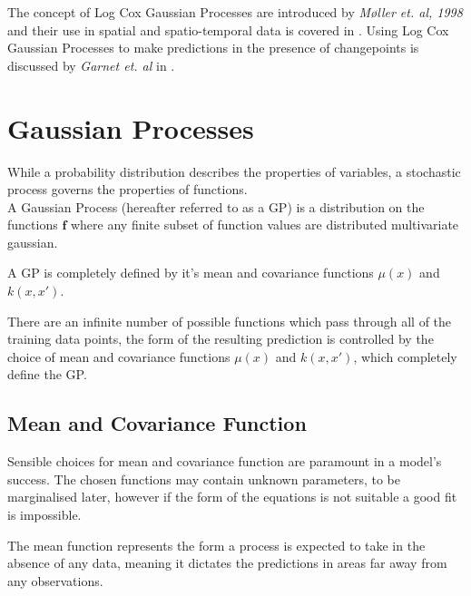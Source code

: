 \documentclass[a4paper,11pt]{report}
\begin{document}
The concept of Log Cox Gaussian Processes are introduced by \textit{M\o ller et. al, 1998} \cite{LGCP-moller} and their use in spatial and spatio-temporal data is covered in \cite{LGCP-diggle}. Using Log Cox Gaussian Processes to make predictions in the presence of changepoints is discussed by \textit{Garnet et. al} in \cite{changepoint-prediction}.

\chapter{Gaussian Processes}

While a probability distribution describes the properties of variables, a stochastic process governs the properties of functions. \\

A Gaussian Process (hereafter referred to as a GP) is a distribution on the functions \(\mathbf{f}\) where any finite subset of function values are distributed multivariate gaussian. 

A GP is completely defined by it's mean and covariance functions \(\mu (x)\) and \( k(x,x')\). 

There are an infinite number of possible functions which pass through all of the training data points, the form of the resulting prediction is controlled by the choice of mean and covariance functions \(\mu (x)\) and \( k(x,x')\), which completely define the GP.

\section{Mean and Covariance Function}

Sensible choices for mean and covariance function are paramount in a model's success. The chosen functions may contain unknown parameters, to be marginalised later, however if the form of the equations is not suitable a good fit is impossible. \\ \par

The mean function represents the form a process is expected to take in the absence of any data, meaning it dictates the predictions in areas far away from any observations.
\end{document}
